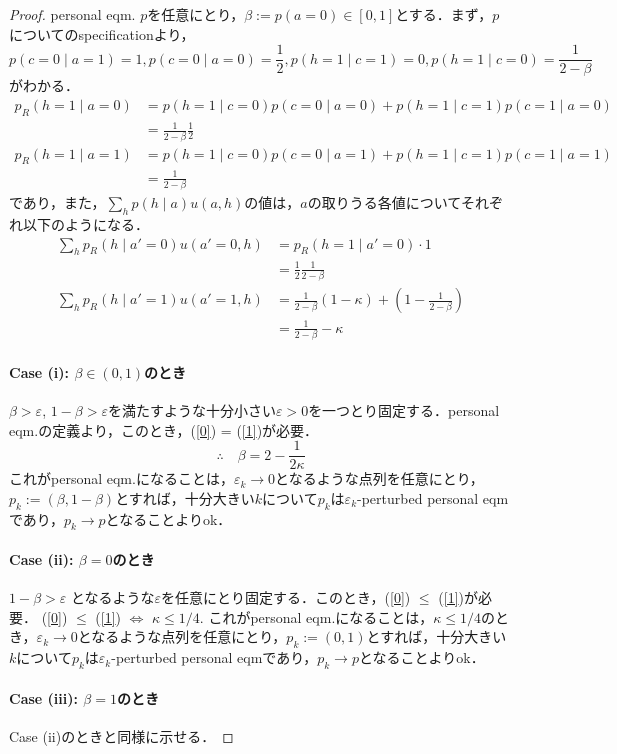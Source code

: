 \documentclass[11pt,a4paper,dvipdfmx]{article}
\theoremstyle{plain}
\renewcommand{\epsilon}{\varepsilon}
\newcommand{\equi}{\Longleftrightarrow}
\begin{document}
\begin{proof}
	personal eqm. $p$を任意にとり，$\beta := p(a = 0) \in [0,1]$とする．まず，$p$についてのspecificationより，
	\[
	p(c=0 \mid a=1) = 1, p(c=0 \mid a=0) = \frac{1}{2}, p(h=1 \mid c=1) = 0, p(h=1 \mid c=0) = \frac{1}{2 - \beta}
	\]
	がわかる．
	\begin{align*}
		p_R(h=1 \mid a=0)
		&= p(h=1 \mid c=0)p(c=0 \mid a=0) + p(h=1 \mid c=1)p(c=1 \mid a=0) \\
		&= \frac{1}{2 - \beta} \frac{1}{2}
	\end{align*}
	\begin{align*}
		p_R(h=1 \mid a=1)
		&= p(h=1 \mid c=0)p(c=0 \mid a=1) + p(h=1 \mid c=1)p(c=1 \mid a=1) \\
		&= \frac{1}{2 - \beta}
	\end{align*}
	であり，また，$\sum_h p(h \mid a) u(a,h)$の値は，$a$の取りうる各値についてそれぞれ以下のようになる．
	\begin{align}
		\sum_h p_R(h \mid a' = 0) u(a' = 0, h)
		&= p_R(h=1 \mid a'=0) \cdot 1 \nonumber \\
		&= \frac{1}{2} \frac{1}{2 - \beta} \tag{E0} \label{0} \\
		\sum_h p_R(h \mid a' = 1) u(a' = 1, h)
		&= \frac{1}{2 - \beta}(1 - \kappa) + \left( 1 - \frac{1}{2 - \beta} \right) \nonumber \\
		&= \frac{1}{2 - \beta} - \kappa \tag{E1} \label{1}
	\end{align}
	
	\paragraph{Case (i): $\beta \in (0,1)$のとき}
	$\beta > \epsilon$, $1 - \beta > \epsilon$を満たすような十分小さい$\epsilon > 0$を一つとり固定する．personal eqm.の定義より，このとき，(\ref{0}) = (\ref{1})が必要．
	$$
	\therefore \quad \beta = 2 - \frac{1}{2 \kappa}
	$$
	これがpersonal eqm.になることは，$\epsilon_k \to 0$となるような点列を任意にとり，$p_k := (\beta, 1- \beta)$とすれば，十分大きい$k$について$p_k$は$\epsilon_k$-perturbed personal eqmであり，$p_k \to p$となることよりok．
	
	\paragraph{Case (ii): $\beta = 0$のとき}
	$1 - \beta > \epsilon$ となるような$\epsilon$を任意にとり固定する．このとき，(\ref{0}) $\leq$ (\ref{1})が必要．
	(\ref{0}) $\leq$ (\ref{1}) $\equi$ $\kappa \leq 1/4$.
	これがpersonal eqm.になることは，$\kappa \leq 1/4$のとき，$\epsilon_k \to 0$となるような点列を任意にとり，$p_k := (0, 1)$とすれば，十分大きい$k$について$p_k$は$\epsilon_k$-perturbed personal eqmであり，$p_k \to p$となることよりok．
	
	\paragraph{Case (iii): $\beta = 1$のとき} Case (ii)のときと同様に示せる．
\end{proof}
\end{document}
